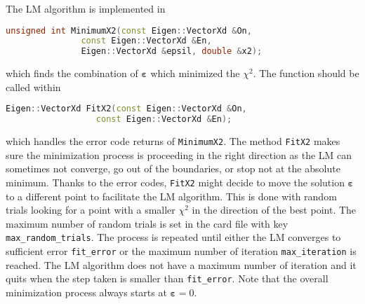 \documentclass[a4paper, 11pt]{article}
\newcommand{\bs}{\boldsymbol}
\begin{document}
The LM algorithm is implemented in 
\begin{lstlisting}[language=C++]
    unsigned int MinimumX2(const Eigen::VectorXd &On,
			   const Eigen::VectorXd &En,
			   Eigen::VectorXd &epsil, double &x2);
\end{lstlisting}
which finds the combination of $\bs{\varepsilon}$ which minimized the $\chi^2$.
The function should be called within 
\begin{lstlisting}[language=C++]
    Eigen::VectorXd FitX2(const Eigen::VectorXd &On,
		          const Eigen::VectorXd &En);
\end{lstlisting}
which handles the error code returns of \texttt{MinimumX2}.
The method \texttt{FitX2} makes sure the minimization process is proceeding in the right direction %
as the LM can sometimes not converge, go out of the boundaries, or stop not at the absolute minimum.
Thanks to the error codes, \texttt{FitX2} might decide to move the solution $\bs{\varepsilon}$ to %
a different point to facilitate the LM algorithm.
This is done with random trials looking for a point with a smaller $\chi^2$ in the direction of the best point.
The maximum number of random trials is set in the card file with key \texttt{max\_random\_trials}.
The process is repeated until either the LM converges to sufficient error \texttt{fit\_error} or %
the maximum number of iteration \texttt{max\_iteration} is reached.
The LM algorithm does not have a maximum number of iteration and it quits when the step taken is smaller than \texttt{fit\_error}.
Note that the overall minimization process always starts at $\bs{\varepsilon} = 0$.



\end{document}
